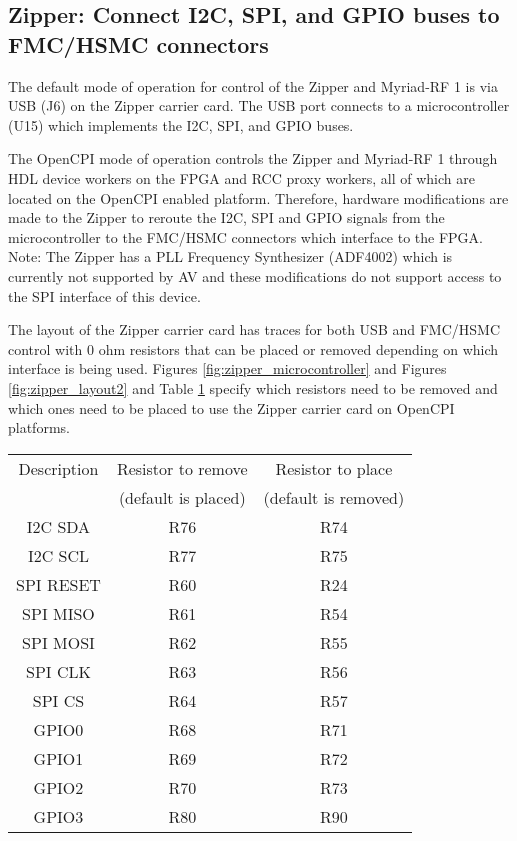 \subsection*{Zipper: Connect I2C, SPI, and GPIO buses to FMC/HSMC connectors}
\small
The default mode of operation for control of the Zipper and Myriad-RF 1 is via USB (J6) on the Zipper carrier card. The USB port connects to a microcontroller (U15)  which implements the I2C, SPI, and GPIO buses.\par\medskip
\noindent The OpenCPI mode of operation controls the Zipper and Myriad-RF 1 through HDL device workers on the FPGA and RCC proxy workers, all of which are located on the OpenCPI enabled platform. Therefore, hardware modifications are made to the Zipper to reroute the I2C, SPI and GPIO signals from the microcontroller to the FMC/HSMC connectors which interface to the FPGA. Note: The Zipper has a PLL Frequency Synthesizer (ADF4002) which is currently not supported by AV and these modifications do not support access to the SPI interface of this device.\par\medskip
\noindent The layout of the Zipper carrier card has traces for both USB and FMC/HSMC control with 0 ohm resistors that can be placed or removed depending on which interface is being used. Figures \ref{fig:zipper_microcontroller} and Figures \ref{fig:zipper_layout2} and Table \ref{table:resistors_to_replace} specify which resistors need to be removed and which ones need to be placed to use the Zipper carrier card on OpenCPI platforms.\par\bigskip
	\scriptsize
	\begin{table}[h]
	\begin{center}
	\scriptsize
	\begin{tabular}{|c|c|c|}
		\hline
    	\rowcolor{blue}
    	Description & Resistor to remove & Resistor to place\\
    	\rowcolor{blue}
    	~ & (default is placed) & (default is removed) \\
    	\hline
    	I2C SDA & R76 & R74 \\
    	\hline
    	I2C SCL & R77 & R75 \\
    	\hline
    	SPI RESET & R60 & R24 \\
    	\hline
    	SPI MISO & R61 & R54 \\
    	\hline
    	SPI MOSI & R62 & R55 \\
    	\hline
    	SPI CLK & R63 & R56 \\
    	\hline
    	SPI CS & R64 & R57 \\
    	\hline
    	GPIO0 & R68 & R71 \\
    	\hline
    	GPIO1 & R69 & R72 \\
    	\hline
    	GPIO2 & R70 & R73 \\
    	\hline
    	GPIO3 & R80 & R90 \\
    	\hline
    \end{tabular}
   	\label{table:resistors_to_replace}
	\end{center}
   	\end{table}
